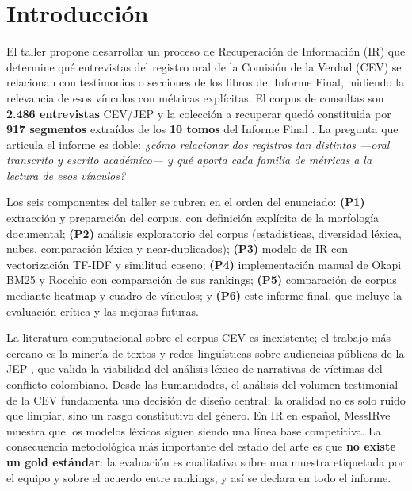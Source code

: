 \documentclass[11pt]{tg_usta}
\begin{document}
\section{Introducción}

El taller propone desarrollar un proceso de Recuperación de Información (IR) que determine qué entrevistas del registro oral de la Comisión de la Verdad (CEV) se relacionan con testimonios o secciones de los libros del Informe Final, midiendo la relevancia de esos vínculos con métricas explícitas. El corpus de consultas son \textbf{2.486 entrevistas} CEV/JEP y la colección a recuperar quedó constituida por \textbf{917 segmentos} extraídos de los \textbf{10 tomos} del Informe Final \cite{cev2022informe}. La pregunta que articula el informe es doble: \textit{¿cómo relacionar dos registros tan distintos ---oral transcrito y escrito académico--- y qué aporta cada familia de métricas a la lectura de esos vínculos?}

Los seis componentes del taller se cubren en el orden del enunciado: \textbf{(P1)} extracción y preparación del corpus, con definición explícita de la morfología documental; \textbf{(P2)} análisis exploratorio del corpus (estadísticas, diversidad léxica, nubes, comparación léxica y near-duplicados); \textbf{(P3)} modelo de IR con vectorización TF-IDF y similitud coseno; \textbf{(P4)} implementación manual de Okapi BM25 y Rocchio con comparación de sus rankings; \textbf{(P5)} comparación de corpus mediante heatmap y cuadro de vínculos; y \textbf{(P6)} este informe final, que incluye la evaluación crítica y las mejoras futuras.

La literatura computacional sobre el corpus CEV es inexistente; el trabajo más cercano es la minería de textos y redes lingüísticas sobre audiencias públicas de la JEP \cite{sosa2025constructing}, que valida la viabilidad del análisis léxico de narrativas de víctimas del conflicto colombiano. Desde las humanidades, el análisis del volumen testimonial de la CEV \cite{castillejo2023escuchar} fundamenta una decisión de diseño central: la oralidad no es solo ruido que limpiar, sino un rasgo constitutivo del género. En IR en español, MessIRve \cite{valentini2024messirve} muestra que los modelos léxicos siguen siendo una línea base competitiva. La consecuencia metodológica más importante del estado del arte es que \textbf{no existe un gold estándar}: la evaluación es cualitativa sobre una muestra etiquetada por el equipo y sobre el acuerdo entre rankings, y así se declara en todo el informe.
\end{document}
